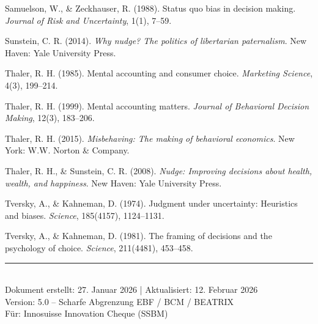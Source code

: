 \documentclass[11pt,a4paper]{article}
\begin{document}
\vspace{0.3cm}
Samuelson, W., \& Zeckhauser, R. (1988). Status quo bias in decision making. \textit{Journal of Risk and Uncertainty}, 1(1), 7--59.

\vspace{0.3cm}
Sunstein, C. R. (2014). \textit{Why nudge? The politics of libertarian paternalism}. New Haven: Yale University Press.

\vspace{0.3cm}
Thaler, R. H. (1985). Mental accounting and consumer choice. \textit{Marketing Science}, 4(3), 199--214.

\vspace{0.3cm}
Thaler, R. H. (1999). Mental accounting matters. \textit{Journal of Behavioral Decision Making}, 12(3), 183--206.

\vspace{0.3cm}
Thaler, R. H. (2015). \textit{Misbehaving: The making of behavioral economics}. New York: W.W. Norton \& Company.

\vspace{0.3cm}
Thaler, R. H., \& Sunstein, C. R. (2008). \textit{Nudge: Improving decisions about health, wealth, and happiness}. New Haven: Yale University Press.

\vspace{0.3cm}
Tversky, A., \& Kahneman, D. (1974). Judgment under uncertainty: Heuristics and biases. \textit{Science}, 185(4157), 1124--1131.

\vspace{0.3cm}
Tversky, A., \& Kahneman, D. (1981). The framing of decisions and the psychology of choice. \textit{Science}, 211(4481), 453--458.

\vspace{2cm}

\begin{center}
\rule{0.4\textwidth}{0.5pt}\\[0.5em]
{\small Dokument erstellt: 27. Januar 2026 | Aktualisiert: 12. Februar 2026}\\
{\small Version: 5.0 -- Scharfe Abgrenzung EBF / BCM / BEATRIX}\\
{\small Für: Innosuisse Innovation Cheque (SSBM)}
\end{center}
\end{document}
